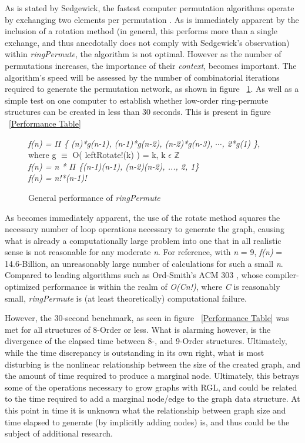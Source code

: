 \documentclass[12pt]{article}
\begin{document}
As is stated by Sedgewick, the fastest computer permutation algorithms operate by exchanging two elements per permutation \cite{Sedgewick:1977}.
As is immediately apparent by the inclusion of a rotation method (in general, this performs more than a single exchange, and thus anecdotally does not comply with Sedgewick's observation) within \emph{ringPermute}, the algorithm is not optimal.
However as the number of permutations increases, the importance of their \emph{context}, becomes important.
The algorithm's speed will be assessed by the number of combinatorial iterations required to generate the permutation network, as shown in figure ~\ref{ringPermute-Derivation}.
As well as a simple test on one computer to establish whether low-order ring-permute structures can be created in less than 30 seconds.
This is present in figure ~\ref{Performance Table}\\

\hspace{0.5cm}
\begin{figure}[ht]
\onehalfspacing
\centering
\emph{f(n) = $\Pi$ \{ (n)*g(n-1), (n-1)*g(n-2), (n-2)*g(n-3), $\cdots$, 2*g(1) \},}\\
 where g $\equiv$ O( leftRotate!(k) ) = k, k $\epsilon$ $\mathbb{Z}$\\
\emph{f(n) = n * $\Pi$ \{(n-1)(n-1), (n-2)(n-2), ..., 2, 1\}}\\
\emph{f(n) = n!*(n-1)!}
\caption{General performance of \emph{ringPermute}}
\label{ringPermute-Derivation}
\end{figure}
\pagebreak[3]
\doublespacing

As becomes immediately apparent, the use of the rotate method squares the necessary number of loop operations necessary to generate the graph, causing what is already a computationally large problem into one that in all realistic sense is not reasonable for any moderate \emph{n}.
For reference, with \emph{n} = 9, \emph{f(n)} = 14.6-Billion, an unreasonably large number of calculations for such a small \emph{n}.
Compared to leading algorithms such as Ord-Smith's ACM 303 \cite{Ord-Smith:1968}, whose compiler-optimized performance is within the realm of \emph{O(Cn!)}, where \emph{C} is reasonably small, \emph{ringPermute} is (at least theoretically) computational failure.\\
\pagebreak[1]

However, the 30-second benchmark, as seen in figure ~\ref{Performance Table} was met for all structures of 8-Order or less.
 What is alarming however, is the divergence of the elapsed time between 8-, and 9-Order structures.
Ultimately, while the time discrepancy is outstanding in its own right, what is most disturbing is the nonlinear relationship between the size of the created graph, and the amount of time required to produce a marginal node.
Ultimately, this betrays some of the operations necessary to grow graphs with RGL, and could be related to the time required to add a marginal node/edge to the graph data structure.
At this point in time it is unknown  what the relationship between graph size and time elapsed to generate (by implicitly adding nodes) is, and thus could be the subject of additional research.\\
\end{document}
